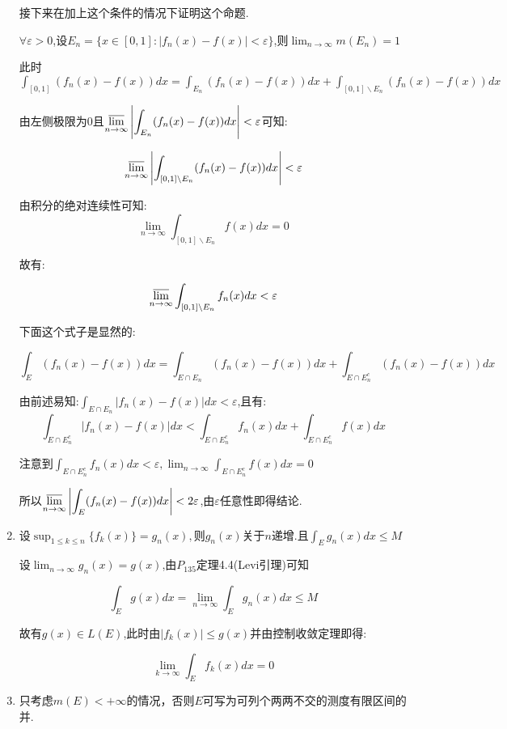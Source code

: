 \documentclass[UTF8, a4paper, 12pt, oneside, onecolumn]{article}
\numberwithin{equation}{section}
\numberwithin{figure}{section}
\numberwithin{table}{section}
\theoremstyle{nonumberplain}	%
\theoremstyle{plain}	%
\theoremstyle{plain}	%
\theoremstyle{plain}	%
\theoremstyle{plain}	%
\theoremstyle{nonumberplain}
\begin{document}
\begin{enumerate}
	接下来在加上这个条件的情况下证明这个命题.
	
	$\forall \varepsilon>0$,设$\displaystyle E_n=\{x\in[0,1]:|f_n(x)-f(x)|<\varepsilon\}$,则$\displaystyle\lim_{n\rightarrow \infty}m(E_n)=1$
	
	此时$\displaystyle\int_{[0,1]}(f_n(x)-f(x))dx=\int_{E_n}(f_n(x)-f(x))dx+\int_{[0,1]\backslash E_n}(f_n(x)-f(x))dx$
	
	由左侧极限为0且$\displaystyle\varlimsup_{n\rightarrow \infty}\left|\int_{E_n}(f_n(x)-f(x))dx\right|<\varepsilon $可知:
	
	$$\displaystyle\varlimsup_{n\rightarrow\infty}\left|\int_{[0,1]\backslash E_n}(f_n(x)-f(x))dx\right|<\varepsilon$$
	
	由积分的绝对连续性可知:
	$$\displaystyle\lim_{n\rightarrow \infty}\int_{[0,1]\backslash E_n}f(x)dx=0$$
	
	故有:
	
	$$\displaystyle\varlimsup_{n\rightarrow\infty}\int_{[0,1]\backslash E_n}f_n(x)dx<\varepsilon$$
	
	下面这个式子是显然的:
	
	$$\displaystyle\int_E (f_n(x)-f(x))dx=\int_{E\cap E_n} (f_n(x)-f(x))dx+\int_{E\cap E_n^c} (f_n(x)-f(x))dx$$
	
	由前述易知:$\displaystyle \int_{E\cap E_n} |f_n(x)-f(x)|dx<\varepsilon$,且有:
	$$\displaystyle\int_{E\cap E_n^c} |f_n(x)-f(x)|dx<\int_{E\cap E_n^c}f_n(x)dx+\int_{E\cap E_n^c}f(x)dx$$
	
	注意到$\displaystyle\int_{E\cap E_n^c}f_n(x)dx<\varepsilon,\lim_{n\rightarrow \infty}\int_{E\cap E_n^c}f(x)dx=0$
	
	所以$\displaystyle\varlimsup_{n\rightarrow \infty}\left| \int_E (f_n(x)-f(x))dx\right| <2\varepsilon$,由$\varepsilon$任意性即得结论.	
	
	\item 设$\displaystyle\sup_{1\leqslant k\leqslant n }\{f_k(x)\}=g_n(x),$则$g_n(x)$关于$n$递增.且$\displaystyle\int_{E}g_n(x)dx\leqslant M$
	
	设$\displaystyle\lim_{n\rightarrow \infty}g_n(x)=g(x)$,由$P_{135}$定理4.4(Levi引理)可知
	
	$$\int_E g(x)dx=\lim_{n\rightarrow \infty}\int_Eg_n(x)dx\leqslant M$$
	
	故有$g(x)\in L(E)$,此时由$|f_k(x)|\leqslant g(x)$并由控制收敛定理即得:
	
	$$\lim_{k\rightarrow \infty}\int_Ef_k(x)dx=0$$
	
	
	\item 只考虑$m(E)<+\infty$的情况，否则$E$可写为可列个两两不交的测度有限区间的并.
	

\end{enumerate}
\end{document}
